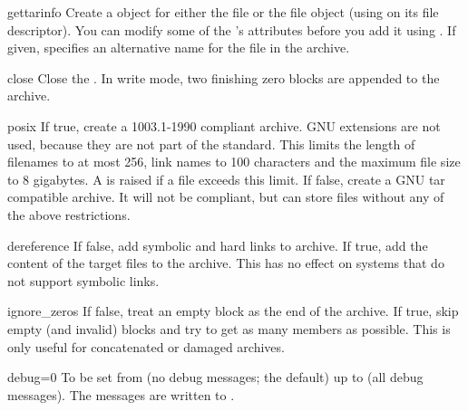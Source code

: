 \begin{methoddesc}{gettarinfo}{}
    Create a  object for either the file  or
    the file object  (using  on its
    file descriptor).  You can modify some of the 's
    attributes before you add it using .  If given,
     specifies an alternative name for the file in the
    archive.
\end{methoddesc}

\begin{methoddesc}{close}{}
    Close the . In write mode, two finishing zero
    blocks are appended to the archive.
\end{methoddesc}

\begin{memberdesc}{posix}
    If true, create a \POSIX{} 1003.1-1990 compliant archive. GNU
    extensions are not used, because they are not part of the \POSIX{}
    standard.  This limits the length of filenames to at most 256,
    link names to 100 characters and the maximum file size to 8
    gigabytes. A  is raised if a file exceeds
    this limit.  If false, create a GNU tar compatible archive.  It
    will not be \POSIX{} compliant, but can store files without any
    of the above restrictions. 
\end{memberdesc}

\begin{memberdesc}{dereference}
    If false, add symbolic and hard links to archive. If true, add the
    content of the target files to the archive.  This has no effect on
    systems that do not support symbolic links.
\end{memberdesc}

\begin{memberdesc}{ignore_zeros}
    If false, treat an empty block as the end of the archive. If true,
    skip empty (and invalid) blocks and try to get as many members as
    possible. This is only useful for concatenated or damaged
    archives.
\end{memberdesc}

\begin{memberdesc}{debug=0}
    To be set from  (no debug messages; the default) up to
     (all debug messages). The messages are written to
    .
\end{memberdesc}

